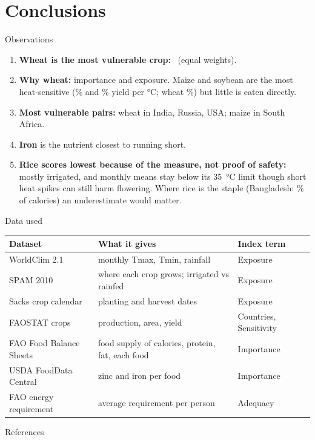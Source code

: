 \documentclass[aspectratio=169,11pt]{beamer}
\begin{document}
\section{Conclusions}
\begin{frame}{Observations}
\small
\begin{enumerate}\setlength{\itemsep}{4pt}
\item \textbf{Wheat is the most vulnerable crop:} \orderFour\ (equal weights).
\item \textbf{Why wheat:} importance and exposure. Maize and soybean are the most heat-sensitive (\poolTMaize\% and \poolTSoybean\% yield per \si{\celsius}; wheat \poolTWheat\%) but little is eaten directly.
\item \textbf{Most vulnerable pairs:} wheat in India, Russia, USA; maize in South Africa.
\item \textbf{Iron} is the nutrient closest to running short.
\item \textbf{Rice scores lowest because of the measure, not proof of safety:} mostly irrigated, and monthly means stay below its \SI{35}{\celsius} limit though short heat spikes can still harm flowering. Where rice is the staple (Bangladesh: \bdRiceKcal\% of calories) an underestimate would matter.
\end{enumerate}
\end{frame}

\begin{frame}{Data used}
\small
\begin{tabular}{p{4.0cm}p{5.8cm}p{3.0cm}}
\toprule
Dataset & What it gives & Index term\\
\midrule
WorldClim 2.1 & monthly Tmax, Tmin, rainfall & Exposure\\
SPAM 2010 & where each crop grows; irrigated vs rainfed & Exposure\\
Sacks crop calendar & planting and harvest dates & Exposure\\
FAOSTAT crops & production, area, yield & Countries, Sensitivity\\
FAO Food Balance Sheets & food supply of calories, protein, fat, each food & Importance\\
USDA FoodData Central & zinc and iron per food & Importance\\
FAO energy requirement & average requirement per person & Adequacy\\
\bottomrule
\end{tabular}
\end{frame}

\begin{frame}[allowframebreaks]{References}
\renewcommand{\bibsection}{}
\scriptsize

\end{frame}
\end{document}
